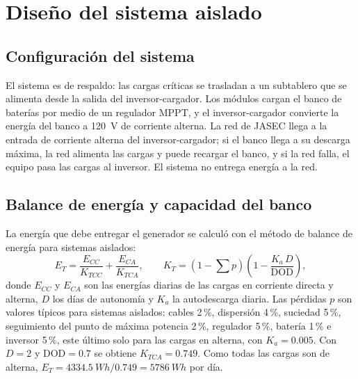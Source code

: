 \section{Diseño del sistema aislado}\label{sec:aislado}

\subsection{Configuración del sistema}

El sistema es de respaldo: las cargas críticas se trasladan a un subtablero que se alimenta desde la salida del inversor-cargador. Los módulos cargan el banco de baterías por medio de un regulador MPPT, y el inversor-cargador convierte la energía del banco a \SI{120}{V} de corriente alterna. La red de JASEC llega a la entrada de corriente alterna del inversor-cargador; si el banco llega a su descarga máxima, la red alimenta las cargas y puede recargar el banco, y si la red falla, el equipo pasa las cargas al inversor. El sistema no entrega energía a la red.

\subsection{Balance de energía y capacidad del banco}\label{sec:balance}

La energía que debe entregar el generador se calculó con el método de balance de energía para sistemas aislados:
\begin{equation}
E_T = \frac{E_{CC}}{K_{TCC}} + \frac{E_{CA}}{K_{TCA}}, \qquad K_T = \left(1-\sum p\right)\left(1-\frac{K_a\,D}{\mathrm{DOD}}\right),
\end{equation}
donde $E_{CC}$ y $E_{CA}$ son las energías diarias de las cargas en corriente directa y alterna, $D$ los días de autonomía y $K_a$ la autodescarga diaria. Las pérdidas $p$ son valores típicos para sistemas aislados: cables 2\,\%, dispersión 4\,\%, suciedad 5\,\%, seguimiento del punto de máxima potencia 2\,\%, regulador 5\,\%, batería 1\,\% e inversor 5\,\%, este último solo para las cargas en alterna, con $K_a=0.005$. Con $D=2$ y $\mathrm{DOD}=0.7$ se obtiene $K_{TCA}=0.749$. Como todas las cargas son de alterna, $E_T = \SI{4334.5}{Wh}/0.749 = \SI{5786}{Wh}$ por día.

